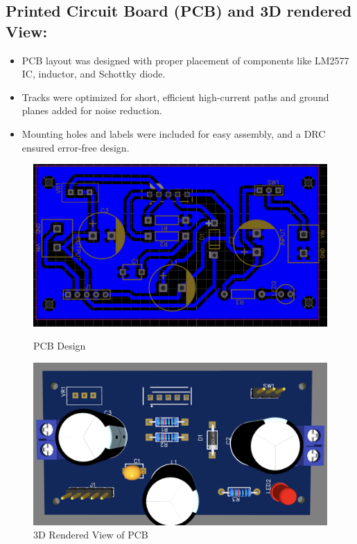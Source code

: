 \documentclass[12pt]{article}
\begin{document}
\subsection*{Printed Circuit Board (PCB) and 3D rendered View:}
\begin{itemize}
    \item PCB layout was designed with proper placement of components like LM2577 IC, inductor, and Schottky diode.
    \item Tracks were optimized for short, efficient high-current paths and ground planes added for noise reduction.
    \item Mounting holes and labels were included for easy assembly, and a DRC ensured error-free design.
\end{itemize}

\begin{figure}[H]
    \centering
    \begin{minipage}{0.48\textwidth}
        \centering
        \includegraphics[width=\textwidth]{pcb.png}
        \caption{PCB Design}
    \end{minipage}
    \hfill
    \begin{minipage}{0.48\textwidth}
        \centering
        \includegraphics[width=\textwidth]{3d.png}
        \caption{3D Rendered View of PCB}
    \end{minipage}
\end{figure}
\end{document}
